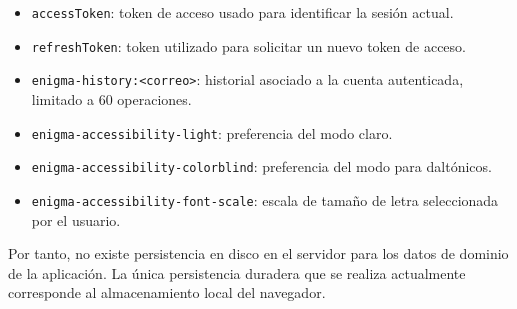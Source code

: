 \begin{itemize}
	\item \texttt{accessToken}: token de acceso usado para identificar la sesión actual.
	
	\item \texttt{refreshToken}: token utilizado para solicitar un nuevo token de acceso.
	
	\item \texttt{enigma-history:\textless correo\textgreater}: historial asociado a la cuenta autenticada, limitado a 60 operaciones.
	
	\item \texttt{enigma-accessibility-light}: preferencia del modo claro.
	
	\item \texttt{enigma-accessibility-colorblind}: preferencia del modo para daltónicos.
	
	\item \texttt{enigma-accessibility-font-scale}: escala de tamaño de letra seleccionada por el usuario.
\end{itemize}

Por tanto, no existe persistencia en disco en el servidor para los datos de dominio de la aplicación. La única persistencia duradera que se realiza actualmente corresponde al almacenamiento local del navegador.
